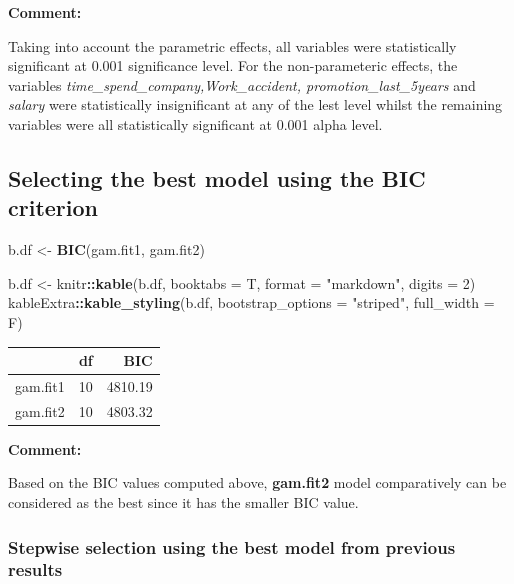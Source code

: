 \documentclass[
  11pt,
]{article}
\newenvironment{Shaded}{\begin{snugshade}}{\end{snugshade}}
\newcommand{\AttributeTok}[1]{\textcolor[rgb]{0.13,0.29,0.53}{#1}}
\newcommand{\DecValTok}[1]{\textcolor[rgb]{0.00,0.00,0.81}{#1}}
\newcommand{\FunctionTok}[1]{\textcolor[rgb]{0.13,0.29,0.53}{\textbf{#1}}}
\newcommand{\NormalTok}[1]{#1}
\newcommand{\OtherTok}[1]{\textcolor[rgb]{0.56,0.35,0.01}{#1}}
\newcommand{\SpecialCharTok}[1]{\textcolor[rgb]{0.81,0.36,0.00}{\textbf{#1}}}
\newcommand{\StringTok}[1]{\textcolor[rgb]{0.31,0.60,0.02}{#1}}
\begin{document}
\hfill\break
\textbf{Comment:}

Taking into account the parametric effects, all variables were
statistically significant at 0.001 significance level. For the
non-parameteric effects, the variables
\emph{time\_spend\_company,Work\_accident, promotion\_last\_5years} and
\emph{salary} were statistically insignificant at any of the lest level
whilst the remaining variables were all statistically significant at
0.001 alpha level.

\hfill\break

\subsection{Selecting the best model using the BIC criterion}

\begin{Shaded}
\begin{Highlighting}[]
\NormalTok{b.df }\OtherTok{\textless{}{-}} \FunctionTok{BIC}\NormalTok{(gam.fit1, gam.fit2)}

\NormalTok{b.df }\OtherTok{\textless{}{-}}\NormalTok{ knitr}\SpecialCharTok{::}\FunctionTok{kable}\NormalTok{(b.df, }\AttributeTok{booktabs =}\NormalTok{ T, }\AttributeTok{format =} \StringTok{"markdown"}\NormalTok{, }\AttributeTok{digits =} \DecValTok{2}\NormalTok{) }
\NormalTok{kableExtra}\SpecialCharTok{::}\FunctionTok{kable\_styling}\NormalTok{(b.df, }\AttributeTok{bootstrap\_options =} \StringTok{"striped"}\NormalTok{, }\AttributeTok{full\_width =}\NormalTok{ F)}
\end{Highlighting}
\end{Shaded}

\begin{longtable}[]{@{}lrr@{}}
\toprule\noalign{}
& df & BIC \\
\midrule\noalign{}
\endhead
\bottomrule\noalign{}
\endlastfoot
gam.fit1 & 10 & 4810.19 \\
gam.fit2 & 10 & 4803.32 \\
\end{longtable}

\hfill\break
\textbf{Comment:}

Based on the BIC values computed above, \textbf{gam.fit2} model
comparatively can be considered as the best since it has the smaller BIC
value.\\

\subsubsection{Stepwise selection using the best model from previous results}
\end{document}
